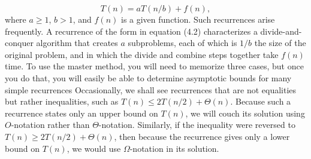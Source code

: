 \documentclass{report}
\begin{document}
        \[
            T(n) = aT(n/b) + f(n) , \tag{4.2}
        \]
        where \( a \geq 1 \), \( b > 1 \), and \( f(n) \) is a given function. Such recurrences arise frequently. A recurrence of the form in equation (4.2) characterizes a divide-and-conquer algorithm that creates \( a \) subproblems, each of which is \( 1/b \) the size of the original problem, and in which the divide and combine steps together take \( f(n) \) time.
        \bigbreak \noindent 
        To use the master method, you will need to memorize three cases, but once you do that, you will easily be able to determine asymptotic bounds for many simple recurrences
        \bigbreak \noindent 
        Occasionally, we shall see recurrences that are not equalities but rather inequalities, such as \( T(n) \leq 2T(n/2) + \Theta(n) \). Because such a recurrence states only an upper bound on \( T(n) \), we will couch its solution using \( O \)-notation rather than \( \Theta \)-notation. Similarly, if the inequality were reversed to \( T(n) \geq 2T(n/2) + \Theta(n) \), then because the recurrence gives only a lower bound on \( T(n) \), we would use \( \Omega \)-notation in its solution.
        \bigbreak \noindent 
\end{document}
